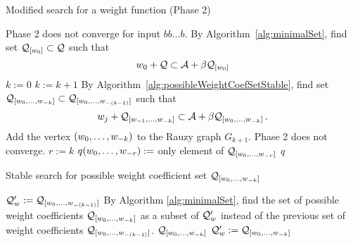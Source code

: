 \begin{algorithm}
  \caption{Modified search for a weight function (Phase 2)}
    \label{alg:weightFunction_modified}
  \begin{algorithmic}[1]
    		\RETURN Phase 2 does not converge for input $bb\dots b$.
    	\ENDIF
    \ENDFOR
        \STATE By Algorithm~\ref{alg:minimalSet}, find set $\mathcal{Q}_{[w_0]} \subset \mathcal{Q}$ such that
          $$
          w_0 + \mathcal{Q} \subset \mathcal{A} + \beta \mathcal{Q}_{[w_0]}
          $$\vspace{-20pt}
    \ENDFOR
    \STATE $k:=0$
        \STATE $k:= k +1$
            \STATE By Algorithm~\ref{alg:possibleWeightCoefSetStable}, find set $\mathcal{Q}_{[w_{0}, \dots, w_{-k}]} \subset \mathcal{Q}_{[w_{0}, \dots, w_{-(k-1)}]}$ such that
              $$
              w_j + \mathcal{Q}_{[w_{-1}, \dots, w_{-k}]} \subset \mathcal{A} + \beta \mathcal{Q}_{[w_{0}, \dots, w_{-k}]}\,.
              $$\vspace{-20pt}
              	\STATE Add the vertex $(w_{0}, \dots, w_{-k})$ to the Rauzy graph $G_{k+1}$.
              		\RETURN Phase 2 does not converge.
              	\ENDIF
              \ENDIF
        \ENDFOR  
    \ENDWHILE  
    \STATE $r:= k$ 
        \STATE $q(w_{0}, \dots, w_{-r}):=$ only element of $\mathcal{Q}_{[w_{0}, \dots, w_{-r}]}$
    \ENDFOR
    \RETURN $q$
  \end{algorithmic}
\end{algorithm}

\begin{algorithm}
  \caption{Stable search for possible weight coefficient set $\mathcal{Q}_{[w_{0}, \dots, w_{-k}]}$}
    \label{alg:possibleWeightCoefSetStable}
  \begin{algorithmic}[1]
	\STATE $\mathcal{Q}'_w:=\mathcal{Q}_{[w_{0}, \dots, w_{-(k-1)}]}$
		\STATE By Algorithm \ref{alg:minimalSet}, find the set of possible weight coefficients  $\mathcal{Q}_{[w_{0}, \dots, w_{-k}]}$ as a subset of $\mathcal{Q}'_w$ instead of the previous set of weight coefficients $\mathcal{Q}_{[w_{0}, \dots, w_{-(k-1)}]}$.
			\RETURN $\mathcal{Q}_{[w_{0}, \dots, w_{-k}]}$
		\ENDIF
		\STATE $\mathcal{Q}'_w:=\mathcal{Q}_{[w_{0}, \dots, w_{-k}]}$
	\ENDWHILE
  \end{algorithmic}
\end{algorithm}

